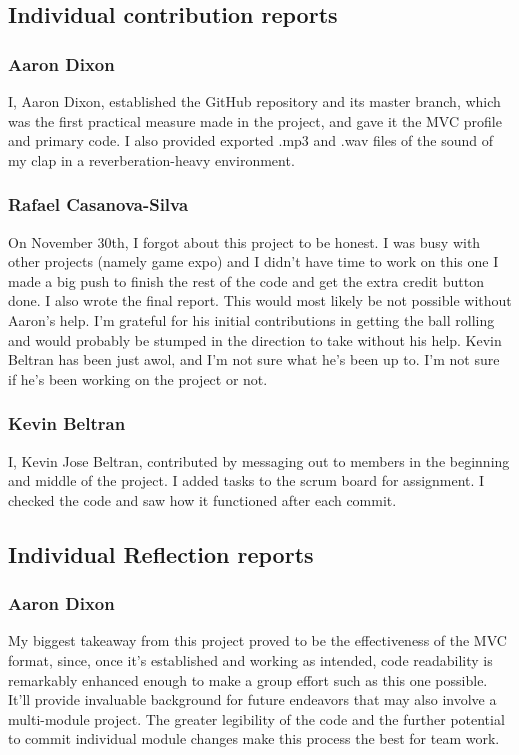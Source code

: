 \documentclass[11pt]{article}
\begin{document}
\subsection{Individual contribution reports}

\subsubsection{Aaron Dixon}
I, Aaron Dixon, established the GitHub repository and its master branch, which was the first practical measure made in the project, and gave it the MVC profile and primary code. I also provided exported .mp3 and .wav files of the sound of my clap in a reverberation-heavy environment.
\subsubsection{Rafael Casanova-Silva}
On November 30th, I forgot about this project to be honest. I was busy with other projects (namely game expo) and I didn't have time to work on this one
I made a big push to finish the rest of the code and get the extra credit button done. I also wrote the final report. This would most likely
be not possible without Aaron's help. I'm grateful for his initial contributions in getting the ball rolling and would probably be stumped in
the direction to take without his help. Kevin Beltran has been just awol, and I'm not sure what he's been up to. I'm not sure if he's been working on the project or not.
\subsubsection{Kevin Beltran}
I, Kevin Jose Beltran, contributed by messaging out to members in the beginning and middle of the project. 
I added tasks to the scrum board for assignment. I checked the code and saw how it functioned after each commit.

\subsection{Individual Reflection reports}

\subsubsection{Aaron Dixon}
My biggest takeaway from this project proved to be the effectiveness of the MVC format, since, once it’s established and working as intended, code readability is remarkably enhanced enough to make a group effort such as this one possible. It’ll provide invaluable background for future endeavors that may also involve a multi-module project. The greater legibility of the code and the further potential to commit individual module changes make this process the best for team work.
\end{document}
